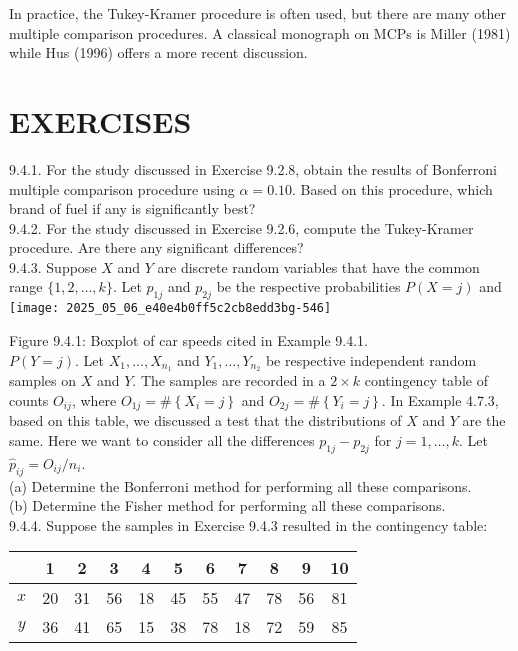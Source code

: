 In practice, the Tukey-Kramer procedure is often used, but there are many other multiple comparison procedures. A classical monograph on MCPs is Miller (1981) while Hus (1996) offers a more recent discussion.

\section*{EXERCISES}
9.4.1. For the study discussed in Exercise 9.2.8, obtain the results of Bonferroni multiple comparison procedure using $\alpha=0.10$. Based on this procedure, which brand of fuel if any is significantly best?\\
9.4.2. For the study discussed in Exercise 9.2.6, compute the Tukey-Kramer procedure. Are there any significant differences?\\
9.4.3. Suppose $X$ and $Y$ are discrete random variables that have the common range $\{1,2, \ldots, k\}$. Let $p_{1 j}$ and $p_{2 j}$ be the respective probabilities $P(X=j)$ and\\
\texttt{[image: 2025\_05\_06\_e40e4b0ff5c2cb8edd3bg-546]}

Figure 9.4.1: Boxplot of car speeds cited in Example 9.4.1.\\
$P(Y=j)$. Let $X_{1}, \ldots, X_{n_{1}}$ and $Y_{1}, \ldots, Y_{n_{2}}$ be respective independent random samples on $X$ and $Y$. The samples are recorded in a $2 \times k$ contingency table of counts $O_{i j}$, where $O_{1 j}=\#\left\{X_{i}=j\right\}$ and $O_{2 j}=\#\left\{Y_{i}=j\right\}$. In Example 4.7.3, based on this table, we discussed a test that the distributions of $X$ and $Y$ are the same. Here we want to consider all the differences $p_{1 j}-p_{2 j}$ for $j=1, \ldots, k$. Let $\hat{p}_{i j}=O_{i j} / n_{i}$.\\
(a) Determine the Bonferroni method for performing all these comparisons.\\
(b) Determine the Fisher method for performing all these comparisons.\\
9.4.4. Suppose the samples in Exercise 9.4.3 resulted in the contingency table:

\begin{center}
\begin{tabular}{|c|c|c|c|c|c|c|c|c|c|c|}
\hline
 & 1 & 2 & 3 & 4 & 5 & 6 & 7 & 8 & 9 & 10 \\
\hline
$x$ & 20 & 31 & 56 & 18 & 45 & 55 & 47 & 78 & 56 & 81 \\
\hline
$y$ & 36 & 41 & 65 & 15 & 38 & 78 & 18 & 72 & 59 & 85 \\
\hline
\end{tabular}
\end{center}

